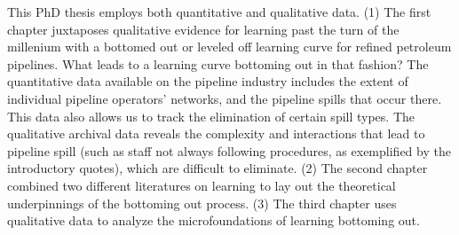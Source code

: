 This PhD thesis employs both quantitative and qualitative data. (1) The first chapter juxtaposes qualitative evidence for learning past the turn of the millenium with a bottomed out or leveled off learning curve for refined petroleum pipelines. What leads to a learning curve bottoming out in that fashion? The quantitative data available on the pipeline industry includes the extent of individual pipeline operators' networks, and the pipeline spills that occur there. This data also allows us to track the elimination of certain spill types. The qualitative archival data reveals the complexity and interactions that lead to pipeline spill (such as staff not always following procedures, as exemplified by the introductory quotes), which are difficult to eliminate. (2) The second chapter combined two different literatures on learning to lay out the theoretical underpinnings of the bottoming out process. (3) The third chapter uses qualitative data to analyze the microfoundations of learning bottoming out.
